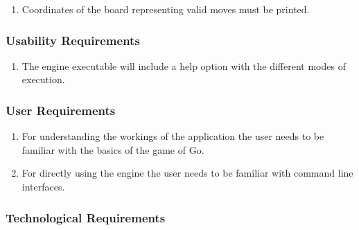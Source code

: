 \begin{enumerate}

	\item Coordinates of the board representing valid moves must be printed.

\end{enumerate}

%

\subsubsection{Usability Requirements}


\begin{enumerate}

	\item The engine executable will include a help option with the different
		modes of execution.

\end{enumerate}

\subsubsection{User Requirements}


\begin{enumerate}

	\item For understanding the workings of the application the user needs to be
		familiar with the basics of the game of Go.

	\item For directly using the engine the user needs to be familiar with
		command line interfaces.

\end{enumerate}

\subsubsection{Technological Requirements}


